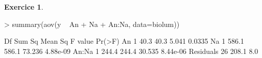 \documentclass[11pt]{report}
\theoremstyle{definition}
\newtheorem{exo}{Exercice}[chapter]
\begin{document}
\begin{exo}
\begin{sol}
\begin{Schunk}
\begin{Sinput}
> summary(aov(y ~ An + Na + An:Na, data=biolum))
\end{Sinput}
\begin{Soutput}
            Df Sum Sq Mean Sq F value   Pr(>F)
An           1   40.3    40.3   5.041   0.0335
Na           1  586.1   586.1  73.236 4.88e-09
An:Na        1  244.4   244.4  30.535 8.44e-06
Residuals   26  208.1     8.0                 
\end{Soutput}
\end{Schunk}

\end{sol}
\end{exo}

%


\end{document}
